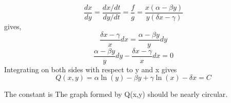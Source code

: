 \documentclass{article}
\begin{document}
\begin{equation*}
    \frac { d x } { d y } = \frac { d x / d t } { d y / d t } = \frac { f } { g } = \frac  { x(\alpha  - \beta  y)} { y(\delta x  - \gamma )}
\end{equation*}
gives,
\begin{equation*}
    \frac { \delta x - \gamma}{x}  d x = \frac  {\alpha - \beta y }{ y } d y
\end{equation*}
\begin{equation*}
     \frac  {\alpha - \beta y }{ y } d y - \frac { \delta x - \gamma}{x}  d x = 0
\end{equation*}
Integrating on both sides with respect to y and x gives
\begin{equation*}
      Q(x,y) = \alpha \ln ( y ) - \beta y + \gamma \ln ( x ) - \delta x   = C
\end{equation*}


The constant is
The graph formed by Q(x,y) should be nearly circular.


\end{document}
